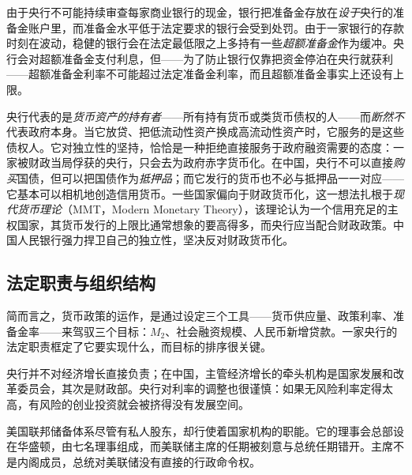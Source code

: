 由于央行不可能持续审查每家商业银行的现金，银行把准备金存放在\emph{设于}央行的准备金账户里，而准备金水平低于法定要求的银行会受到处罚。由于一家银行的存款时刻在波动，稳健的银行会在法定最低限之上多持有一些\emph{超额准备金}作为缓冲。央行会对超额准备金支付利息，但——为了防止银行仅靠把资金停泊在央行就获利——超额准备金利率不可能超过法定准备金利率，而且超额准备金事实上还设有上限。


\begin{remark}[央行代表谁的利益]
央行代表的是\emph{货币资产的持有者}——所有持有货币或类货币债权的人——而\emph{断然不}代表政府本身。当它放贷、把低流动性资产换成高流动性资产时，它服务的是这些债权人。它对独立性的坚持，恰恰是一种拒绝直接服务于政府融资需要的态度：一家被财政当局俘获的央行，只会去为政府赤字货币化。在中国，央行不可以直接\emph{购买}国债，但可以把国债作为\emph{抵押品}；而它发行的货币也不必与抵押品一一对应——它基本可以相机地创造信用货币。一些国家偏向于财政货币化，这一想法扎根于\emph{现代货币理论}（MMT，Modern Monetary Theory），该理论认为一个信用充足的主权国家，其货币发行的上限比通常想象的要高得多，而央行应当配合财政政策。中国人民银行强力捍卫自己的独立性，坚决反对财政货币化。
\end{remark}

\subsection{法定职责与组织结构}

简而言之，货币政策的运作，是通过设定三个工具——货币供应量、政策利率、准备金率——来驾驭三个目标：$M_2$、社会融资规模、人民币新增贷款。一家央行的法定职责框定了它要实现什么，而目标的排序很关键。


央行并不对经济增长直接负责；在中国，主管经济增长的牵头机构是国家发展和改革委员会，其次是财政部。央行对利率的调整也很谨慎：如果无风险利率定得太高，有风险的创业投资就会被挤得没有发展空间。

美国联邦储备体系尽管有私人股东，却行使着国家机构的职能。它的理事会总部设在华盛顿，由七名理事组成，而美联储主席的任期被刻意与总统任期错开。主席不是内阁成员，总统对美联储没有直接的行政命令权。

